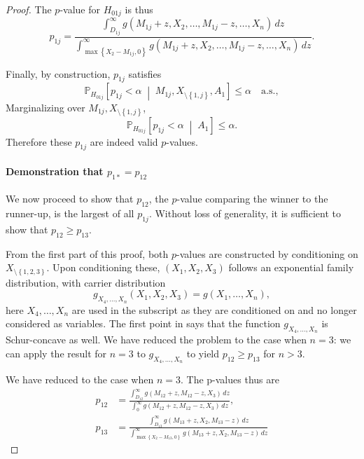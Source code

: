 \documentclass[11pt]{article}
\theoremstyle{definition}
\theoremstyle{custom}
\newcommand{\PP}{\mathbb{P}}
\begin{document}
\begin{proof}
The $p$-value for $H_{01j}$ is thus
\begin{equation}
p_{1j} = \frac{\int_{D_{1j}}^\infty g\left(M_{1j} + z, X_2, \ldots, M_{1j} - z, \ldots, X_n\right) \,dz}{\int_{\max\left\{X_2 - M_{1j}, 0\right\}}^\infty g\left(M_{1j} + z, X_2, \ldots, M_{1j} - z, \ldots, X_n\right) \,dz}.
\label{eq:p1j}
\end{equation}

Finally, by construction, $p_{1j}$ satisfies
\[\PP_{H_{01j}}\left[p_{1j} < \alpha \;\middle|\; M_{1j}, X_{\setminus\left\{1, j\right\}}, A_1\right] \le \alpha \quad \text{a.s.},\]
Marginalizing over $M_{1j}, X_{\setminus\left\{1, j\right\}}$,
\[\PP_{H_{01j}}\left[p_{1j} < \alpha \;\middle|\; A_1\right] \le \alpha.\]
Therefore these $p_{1j}$ are indeed valid $p$-values.

\paragraph{Demonstration that $p_{1*}=p_{12}$}

We now proceed to show that $p_{12}$, the $p$-value comparing the winner to the runner-up, is the largest of all $p_{1j}$. Without loss of generality, it is sufficient to show that $p_{12} \ge p_{13}$.

From the first part of this proof, both $p$-values are constructed by conditioning on $X_{\setminus\left\{1, 2, 3\right\}}$. Upon conditioning these, $\left(X_1, X_2, X_3\right)$ follows an exponential family distribution, with carrier distribution
\[g_{X_4, \ldots, X_n}\left(X_1, X_2, X_3\right) = g\left(X_1, \ldots, X_n\right),\]
here $X_4, \ldots, X_n$ are used in the subscript as they are conditioned on and no longer considered as variables. The first point in  says that the function $g_{X_4, \ldots, X_n}$ is Schur-concave as well. We have reduced the problem to the case when $n = 3$: we can apply the result for $n = 3$ to $g_{X_4, \ldots, X_n}$ to yield $p_{12} \ge p_{13}$ for $n > 3$.

We have reduced to the case when $n = 3$. The p-values thus are
\begin{align*}
p_{12} & = \frac{\int_{D_{12}}^\infty g\left(M_{12} + z, M_{12} - z, X_3\right) \,dz}{\int_0^\infty g\left(M_{12} + z, M_{12} - z, X_3\right) \,dz}, \\
p_{13} & = \frac{\int_{D_{13}}^\infty g\left(M_{13} + z, X_2, M_{13} - z\right) \,dz}{\int_{\max\left\{X_2 - M_{13}, 0\right\}}^\infty g\left(M_{13} + z, X_2, M_{13} - z\right) \,dz}
\end{align*}


\end{proof}
\end{document}
